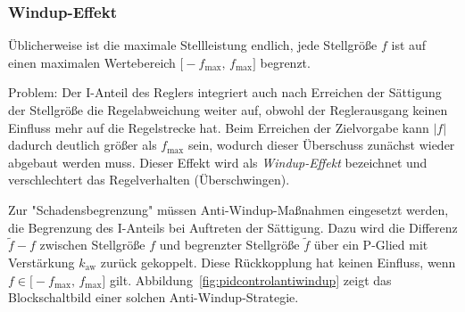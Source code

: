 			\subsubsection{Windup-Effekt}
				Üblicherweise ist die maximale Stellleistung endlich, \dh jede Stellgröße \(f\) ist auf einen maximalen Wertebereich \( \big[ -f_\text{max},\, f_\text{max} \big] \) begrenzt.
				
				Problem: Der I-Anteil des Reglers integriert auch nach Erreichen der Sättigung der Stellgröße die Regelabweichung weiter auf, obwohl der Reglerausgang keinen Einfluss mehr auf die Regelstrecke hat. Beim Erreichen der Zielvorgabe kann \( \lvert f \rvert \) dadurch deutlich größer als \( f_\text{max} \) sein, wodurch dieser Überschuss zunächst wieder abgebaut werden muss. Dieser Effekt wird als \emph{Windup-Effekt} bezeichnet und verschlechtert das Regelverhalten (Überschwingen).
				
				Zur "Schadensbegrenzung" müssen Anti-Windup-Maßnahmen eingesetzt werden, \bspw die Begrenzung des I-Anteils bei Auftreten der Sättigung. Dazu wird die Differenz \( \tilde{f} - f \) zwischen Stellgröße \(f\) und begrenzter Stellgröße \( \tilde{f} \) über ein P-Glied mit Verstärkung \( k_\text{aw} \) zurück gekoppelt. Diese Rückkopplung hat keinen Einfluss, wenn \( f \in \big[ -f_\text{max},\, f_\text{max} \big] \) gilt. Abbildung~\ref{fig:pidcontrolantiwindup} zeigt das Blockschaltbild einer solchen Anti-Windup-Strategie.
				

